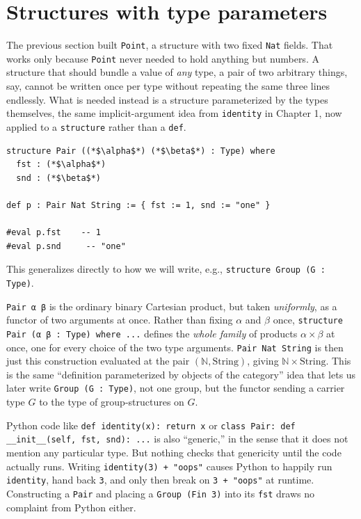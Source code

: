\section{Structures with type parameters}\label{sec:02-functions-and-structures:02-type-parameters:1}

The previous section built \texttt{Point}, a structure with two fixed \texttt{Nat} fields. That works only because \texttt{Point} never needed to hold anything but numbers. A structure that should bundle a value of \emph{any} type, a pair of two arbitrary things, say, cannot be written once per type without repeating the same three lines endlessly. What is needed instead is a structure parameterized by the types themselves, the same implicit-argument idea from \texttt{identity} in Chapter 1, now applied to a \texttt{structure} rather than a \texttt{def}.

\begin{lstlisting}
structure Pair ((*$\alpha$*) (*$\beta$*) : Type) where
  fst : (*$\alpha$*)
  snd : (*$\beta$*)

def p : Pair Nat String := { fst := 1, snd := "one" }

#eval p.fst    -- 1
#eval p.snd     -- "one"
\end{lstlisting}

This generalizes directly to how we will write, e.g., \texttt{structure Group (G : Type)}.

\begin{mathreading}

\texttt{Pair α β} is the ordinary binary Cartesian product, but taken \emph{uniformly}, as a functor of two arguments at once. Rather than fixing \(\alpha\) and \(\beta\) once, \texttt{structure Pair (α β : Type) where ...} defines the \emph{whole family} of products \(\alpha \times \beta\) at once, one for every choice of the two type arguments. \texttt{Pair Nat String} is then just this construction evaluated at the pair \((\mathbb{N}, \mathrm{String})\), giving \(\mathbb{N} \times \mathrm{String}\). This is the same ``definition parameterized by objects of the category'' idea that lets us later write \texttt{Group (G : Type)}, not one group, but the functor sending a carrier type \(G\) to the type of group-structures on \(G\).

\end{mathreading}

\begin{progcorner}

Python code like \texttt{def identity(x): return x} or \texttt{class Pair: def \_\allowbreak{}\_\allowbreak{}init\_\allowbreak{}\_\allowbreak{}(self, fst, snd): ...} is also ``generic,'' in the sense that it does not mention any particular type. But nothing checks that genericity until the code actually runs. Writing \texttt{identity(3) + "oops"} causes Python to happily run \texttt{identity}, hand back \texttt{3}, and only then break on \texttt{3 + "oops"} at runtime. Constructing a \texttt{Pair} and placing a \texttt{Group (Fin 3)} into its \texttt{fst} draws no complaint from Python either.

\end{progcorner}

